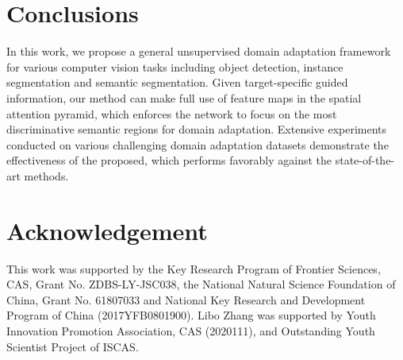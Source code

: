 \documentclass[runningheads]{llncs}
\begin{document}
\section{Conclusions}
In this work, we propose a general unsupervised domain adaptation framework for various computer vision tasks including object detection, instance segmentation and semantic segmentation. Given target-specific guided information, our method can make full use of feature maps in the spatial attention pyramid, which enforces the network to focus on the most discriminative semantic regions for domain adaptation. Extensive experiments conducted on various challenging domain adaptation datasets demonstrate the effectiveness of the proposed, which performs favorably against the state-of-the-art methods.

\section*{Acknowledgement}
This work was supported by the Key Research Program of Frontier Sciences, CAS, Grant No. ZDBS-LY-JSC038, the National Natural Science Foundation of China, Grant No. 61807033 and National Key Research and Development Program of China (2017YFB0801900). Libo Zhang was supported by Youth Innovation Promotion Association, CAS (2020111), and Outstanding Youth Scientist Project of ISCAS.
\end{document}
